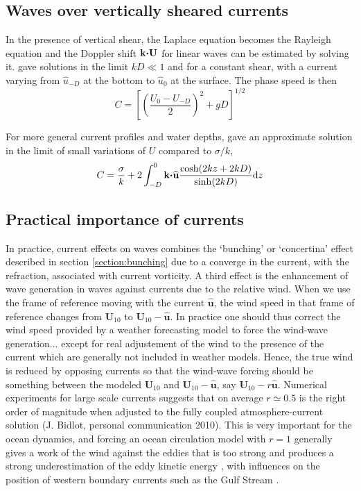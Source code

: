  

\subsection{Waves over vertically sheared currents}
In the presence of vertical shear, the Laplace equation becomes the Rayleigh equation and the Doppler shift  $\mathbf{k} \mbox{\boldmath $\cdot$} \mathbf{U}$ for linear waves 
can be estimated by solving it. 
\cite{Biesel1950}
gave solutions in the limit $kD \ll 1$ and for a constant shear, with a current varying from $\widehat{u}_{-D}$ at the bottom to 
$\widehat{u}_0$ at the surface. The phase speed is then 
\begin{equation}
    C=\left[\left(\frac{U_0-U_{-D}}{2}\right)^2 + gD \right]^{1/2}
\end{equation}

For more general current profiles and water depths,
\cite{Kirby&Chen1989} gave an approximate solution in the limit of small variations of $U$ compared to $\sigma/k$,
\begin{equation}
    C=\frac{\sigma}{k}+2\int_{-D}^0 {\mathbf k} \mbox{\boldmath $\cdot$} \widehat{\mathbf u} \frac{\cosh(2kz+2kD)}{\sinh(2kD)} {\mathrm d}z
\end{equation}

\subsection{Practical importance of currents}
 In practice, current effects on waves combines the `bunching' or `concertina' effect described in section \ref{section:bunching} due to a converge in the current, 
with the refraction, associated with current vorticity. A third effect is the enhancement of wave generation in waves against currents due to the relative wind. When 
we use the frame of reference moving with the current $\widehat{\mathbf u}$, the wind speed in that frame of reference changes from ${\mathbf U}_{10}$
to ${\mathbf U}_{10}-\widehat{\mathbf u}$. In practice one should thus correct the wind speed provided by a weather forecasting model to force the wind-wave generation... except 
for real adjustement of the wind to the presence of the current which are generally not included in weather models. Hence, the true wind is reduced by opposing currents
so that the wind-wave forcing should be something between the modeled ${\mathbf U}_{10}$ and ${\mathbf U}_{10}-\widehat{\mathbf u}$, say 
${\mathbf U}_{10}-r \widehat{\mathbf u}$. Numerical experiments for large scale 
currents suggests that on average $r\simeq 0.5$ is the right order of magnitude when adjusted to the fully coupled atmosphere-current 
solution (J. Bidlot, personal communication 2010). This is very important for the ocean dynamics, and forcing an ocean circulation model with $r=1$ generally gives a work of the wind against the eddies that is too strong and produces a strong underestimation of the eddy kinetic energy \citep{Renault&al.2016}, with influences on the position of western boundary currents such as the Gulf Stream \citep{Renault&al.2016b}.

